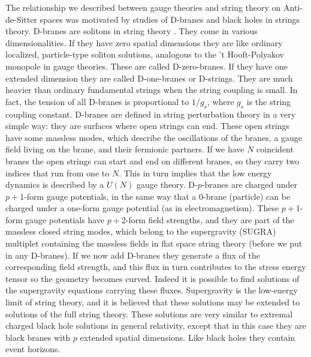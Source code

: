 The relationship we described between gauge theories and string theory 
on Anti-de-Sitter
spaces was motivated by studies of D-branes and black holes in
strings theory. D-branes are solitons in string theory
 \cite{Polchinski:1995mt}. 
They come in various dimensionalities. If they have zero spatial
dimensions they are like ordinary localized, particle-type soliton
solutions, analogous to the 't Hooft-Polyakov 
\cite{'tHooft:1974qc,Polyakov:1974ek} 
monopole in gauge theories. These are called D-zero-branes. 
If they have one extended dimension they are called D-one-branes
or D-strings. They are much heavier than ordinary fundamental strings
when the string coupling is small. In fact, the tension of all D-branes
is proportional to $1/g_s$, where $g_s$ is the string coupling constant.
D-branes are defined in string perturbation theory in a very simple
way: they are surfaces where open strings can end. These open
strings have some massless modes, which describe the oscillations 
of the branes, a gauge field living on the brane, and their
fermionic partners. If we have $N$ coincident branes the open strings
can start and end on different branes, so they carry two indices
that run from one to $N$. 
This in turn implies that the low energy dynamics is 
described by a $U(N)$ gauge theory. 
 D-$p$-branes are charged under $p+1$-form gauge potentials, in the
same way that a 0-brane (particle) can be charged under 
a one-form gauge potential (as in electromagnetism). 
These $p+1$-form gauge potentials have $p+2$-form field strengths, and
they are part of the massless closed
string modes, which belong to the supergravity (SUGRA) multiplet 
containing the massless fields in flat
space string theory (before
we put in any D-branes). If we now add D-branes they generate a 
flux of the corresponding field strength, and this flux in turn 
contributes to the stress energy tensor so the geometry 
becomes curved. Indeed it is possible to find solutions of
the supergravity equations carrying these fluxes. 
Supergravity is the low-energy limit of string theory, and it is
believed that these solutions may be extended to solutions of the full
string theory. These solutions
are very similar to extremal charged black hole solutions in general
relativity, except that in this case they are black branes
with $p$ extended spatial dimensions. Like black holes they contain
event horizons. 

